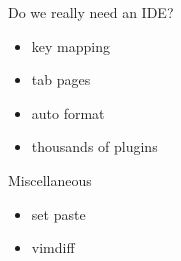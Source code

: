 \documentclass[c]{beamer}
\begin{document}
\begin{frame}{Do we really need an IDE?}
    \begin{itemize}
        \item key mapping
        \pause
        \item tab pages
        \pause
        \item auto format
        \pause
        \item thousands of plugins
    \end{itemize}
\end{frame}

\begin{frame}{Miscellaneous}
    \begin{itemize}
        \item set paste
        \pause
        \item vimdiff
    \end{itemize}
\end{frame}
\end{document}
